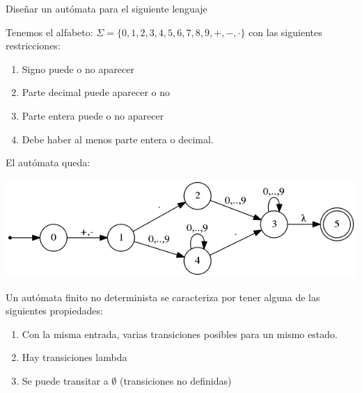 \documentclass{apuntes}
\begin{document}
\begin{example}
Diseñar un autómata para el siguiente lenguaje

Tenemos el alfabeto: $\Sigma = \lbrace 0,1,2,3,4,5,6,7,8,9,+,-,\cdot \rbrace$ con las siguientes restricciones:
\begin{enumerate}
\item Signo puede o no aparecer
\item Parte decimal puede aparecer o no
\item Parte entera puede o no aparecer
\item Debe haber al menos parte entera o decimal.
\end{enumerate}

El autómata queda:
\begin{center}
\includegraphics[scale=0.75]{automata4.png}
\end{center}
\end{example}

\begin{defn}
Un autómata finito no determinista se caracteriza por tener alguna de las siguientes propiedades:
\begin{enumerate}
\item Con la misma entrada, varias transiciones posibles para un mismo estado.
\item Hay transiciones lambda
\item Se puede transitar a $\emptyset$ (transiciones no definidas)
\end{enumerate}
\end{defn}
\end{document}
